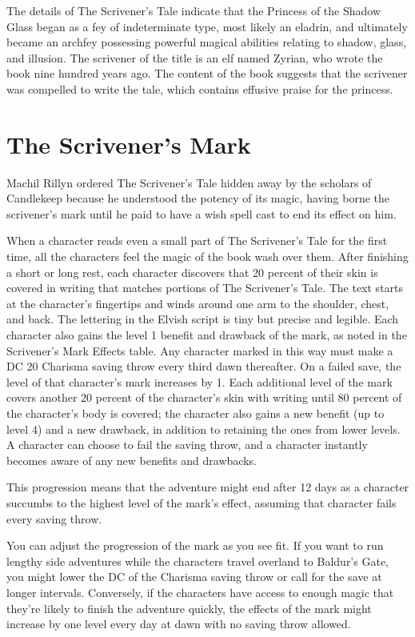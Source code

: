 \documentclass[10pt,a4paper,twoside,bg=print,twocolumn,openany,nodeprecatedcode]{dndbook}
\begin{document}
The details of The Scrivener's Tale indicate that the Princess of the Shadow Glass began as a fey of indeterminate type, most likely an eladrin, and ultimately became an archfey possessing powerful magical abilities relating to shadow, glass, and illusion. The scrivener of the title is an elf named Zyrian, who wrote the book nine hundred years ago. The content of the book suggests that the scrivener was compelled to write the tale, which contains effusive praise for the princess.

\section{The Scrivener's Mark}
Machil Rillyn ordered The Scrivener's Tale hidden away by the scholars of Candlekeep because he understood the potency of its magic, having borne the scrivener's mark until he paid to have a wish spell cast to end its effect on him.

When a character reads even a small part of The Scrivener's Tale for the first time, all the characters feel the magic of the book wash over them. After finishing a short or long rest, each character discovers that 20 percent of their skin is covered in writing that matches portions of The Scrivener's Tale. The text starts at the character's fingertips and winds around one arm to the shoulder, chest, and back. The lettering in the Elvish script is tiny but precise and legible. Each character also gains the level 1 benefit and drawback of the mark, as noted in the Scrivener's Mark Effects table. Any character marked in this way must make a DC 20 Charisma saving throw every third dawn thereafter. On a failed save, the level of that character's mark increases by 1. Each additional level of the mark covers another 20 percent of the character's skin with writing until 80 percent of the character's body is covered; the character also gains a new benefit (up to level 4) and a new drawback, in addition to retaining the ones from lower levels. A character can choose to fail the saving throw, and a character instantly becomes aware of any new benefits and drawbacks.

This progression means that the adventure might end after 12 days as a character succumbs to the highest level of the mark's effect, assuming that character fails every saving throw.

You can adjust the progression of the mark as you see fit. If you want to run lengthy side adventures while the characters travel overland to Baldur's Gate, you might lower the DC of the Charisma saving throw or call for the save at longer intervals. Conversely, if the characters have access to enough magic that they're likely to finish the adventure quickly, the effects of the mark might increase by one level every day at dawn with no saving throw allowed.
\end{document}

